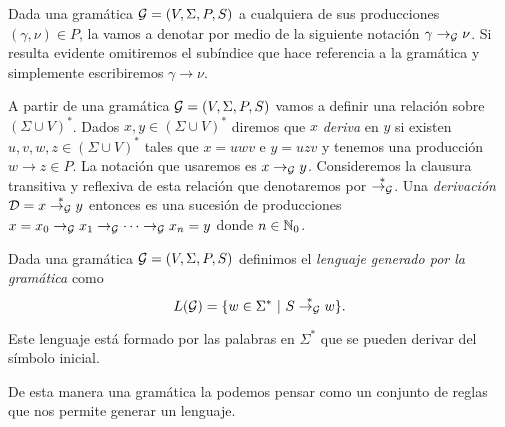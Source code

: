 \documentclass[tesis.tex]{subfiles}
\begin{document}
Dada una gramática ${\cal G} = (V, \Sigma, P, S)$ a cualquiera de sus producciones $(\gamma, \nu) \in P$, la vamos a denotar por medio de la siguiente notación $\gamma \to_{{\cal G}} \nu$. 
Si resulta evidente omitiremos el subíndice que hace referencia a la gramática y simplemente escribiremos $\gamma \to \nu$.

A partir de una gramática ${\cal G} = (V, \Sigma, P, S)$ vamos a definir una relación sobre $(\Sigma \cup V)^*$. 
Dados $x,y \in (\Sigma \cup V)^*$ diremos que $x$ \emph{deriva} en $y$ si existen $u,v,w,z \in (\Sigma \cup V)^*$ tales que $x = uwv$ e $y=uzv$ y tenemos una producción $w \to z \in P$.
La notación que usaremos es $x \to_{{\cal G}} y$. 
Consideremos la clausura transitiva y reflexiva de esta relación que denotaremos por $\overset{*}{\to_{\cal G}}$.
Una \emph{derivación} ${\cal D} = x \overset{*}{\to_{\cal G}} y$ entonces es una sucesión de producciones $x = x_{0} \to_{{\cal G}} x_{1} \to_{{\cal G}} \dots \to_{{\cal G}} x_{n} = y$ donde $n \in \mathbb{N}_{0}$.



\begin{deff}
	Dada una gramática ${\cal G} = (V, \Sigma, P, S)$  definimos el \emph{lenguaje generado por la gramática} como
	\[
	L({\cal G}) = \{ w \in \Sigma^* \ | \ S \overset{*}{\to_{\cal G}} w   \}.
	\]
\end{deff}

Este lenguaje está formado por las palabras en $\Sigma^*$ que se pueden derivar del símbolo inicial.

De esta manera una gramática la podemos pensar como un conjunto de reglas que nos permite generar un lenguaje. 
 
\end{document}

